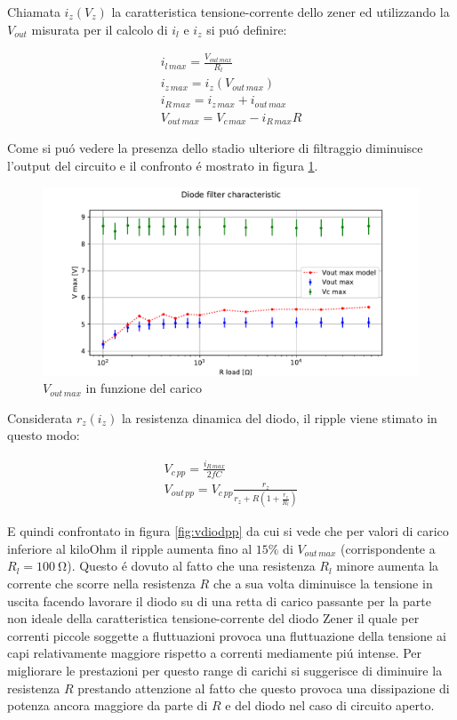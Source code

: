 Chiamata $i_z(V_z)$ la caratteristica tensione-corrente dello zener ed utilizzando la $V_{out}$ misurata per il calcolo di $i_l$ e $i_z$ si pu\'o definire:

\begin{gather}
	i_{l\, max} = \frac{V_{out\, max}}{R_l} \\
	i_{z\, max} = i_z(V_{out\, max}) \\
	i_{R\, max} = i_{z\, max} + i_{out\, max} \\
	V_{out\, max} = V_{c\, max} - i_{R\, max} R
\end{gather}


Come si pu\'o vedere la presenza dello stadio ulteriore di filtraggio diminuisce l'output del circuito e il confronto \'e mostrato in figura \ref{fig:vdiod}.

\begin{figure}[H]
\centering
\includegraphics[width=\textwidth]{fig4.pdf}
\caption{$V_{out\, max}$ in funzione del carico}
\label{fig:vdiod}
\end{figure}

Considerata $r_z(i_z)$ la resistenza dinamica del diodo, il ripple viene stimato in questo modo:

\begin{gather}
	V_{c\, pp} = \frac{i_{R\, max}}{2fC} \\
	V_{out\, pp} = V_{c\, pp} \frac{r_z}{r_z+R(1+\frac{r_z}{R_l})}
\end{gather}

E quindi confrontato in figura \ref{fig:vdiodpp} da cui si vede che per valori di carico inferiore al kiloOhm il ripple aumenta fino al $15\%$ di $V_{out\, max}$ (corrispondente a $R_l=100\ \si{\ohm}$). Questo \'e dovuto al fatto che una resistenza $R_l$ minore aumenta la corrente che scorre nella resistenza $R$ che a sua volta diminuisce la tensione in uscita facendo lavorare il diodo su di una retta di carico passante per la parte non ideale della caratteristica tensione-corrente del diodo Zener il quale per correnti piccole soggette a fluttuazioni provoca una fluttuazione della tensione ai capi relativamente maggiore rispetto a correnti mediamente pi\'u intense. Per migliorare le prestazioni per questo range di carichi si suggerisce di diminuire la resistenza $R$ prestando attenzione al fatto che questo provoca una dissipazione di potenza ancora maggiore da parte di $R$ e del diodo nel caso di circuito aperto.

